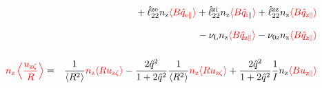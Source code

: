 \documentclass[11pt]{article}
\def\r#1{{\rm#1}}
\def\ave#1{\left\langle#1\right\rangle}
\def\aves#1{\langle#1\rangle}
\def\para{\parallel}
\def\nz{n_\r{z}}
\def\uzt#1{u_{\r{#1}\zeta}}
\def\upara#1{u_{\r{#1}\para}}
\def\qhatpara#1{\hat{q}_{\r{#1}\para}}
\def\nun#1{\nu_\r{0#1}}
\def\nuL{\nu_\r{L}}
\def\red#1{\textcolor{red}{#1}}
\begin{document}
\begin{eqnarray}
\nonumber\\[3mm]&&{}
%
  + \hat{\ell}_{22}^{\r{ze}} \nz \red{\aves{B \qhatpara{e}}} 
  + \hat{\ell}_{22}^{\r{zi}} \nz \red{\aves{B \qhatpara{i}}} 
  + \hat{\ell}_{22}^{\r{zz}} \nz \red{\aves{B \qhatpara{z}}} 
\nonumber\\[3mm]&&{}
%
  - \nuL \nz \red{\aves{B \qhatpara{z}}}
%
  - \nun{z} \nz \red{\aves{B \qhatpara{z}}}
\\[5mm]
    \red{\nz \ave{\frac{\uzt{z}}{R}}} &=&
%
    \frac{1}{\aves{R^2}} \red{\nz \aves{R\uzt{z}}}
%
  - \frac{2\hat{q}^2}{1+2\hat{q}^2} \frac{1}{\aves{R^2}}\red{\nz\aves{R\uzt{z}}}
%
  + \frac{2\hat{q}^2}{1+2\hat{q}^2} \frac{1}{I}\nz \red{\aves{B\upara{z}}}
\end{eqnarray}
%
\end{document}
